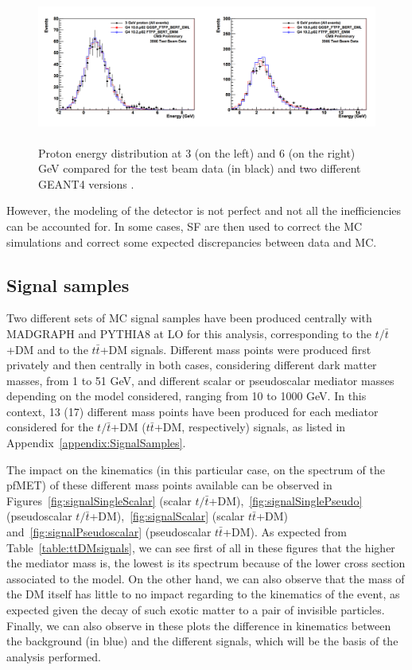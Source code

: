 \documentclass[a4paper, 10pt, openright]{report}
\begin{document}
\begin{figure}[htbp]
\begin{center}
\includegraphics[width=14cm, height=5cm]{figs/CMSGEANT.png}
\caption{Proton energy distribution at 3 (on the left) and 6 (on the right) GeV compared for the test beam data (in black) and two different GEANT4 versions \cite{GEANTComp}.}
\label{fig:CMSGEANT}
\end{center}
\end{figure}

However, the modeling of the detector is not perfect and not all the inefficiencies can be accounted for. In some cases, \ac{SF} are then used to correct the \ac{MC} simulations and correct some expected discrepancies between data and \ac{MC}.

\subsection{Signal samples} \label{section:Signals}

Two different sets of \ac{MC} signal samples have been produced centrally with MADGRAPH and PYTHIA8 at \ac{LO} for this analysis, corresponding to the $t/\bar t$+DM and to the $t \bar t$+DM signals. Different mass points were produced first privately and then centrally in both cases, considering different dark matter masses, from 1 to 51 GeV, and different scalar or pseudoscalar mediator masses depending on the model considered, ranging from 10 to 1000 GeV. In this context, 13 (17) different mass points have been produced for each mediator considered for the $t/\bar t$+DM ($t \bar t$+DM, respectively) signals, as listed in Appendix~\ref{appendix:SignalSamples}.

The impact on the kinematics (in this particular case, on the spectrum of the pf\ac{MET}) of these different mass points available can be observed in Figures~\ref{fig:signalSingleScalar} (scalar $t/\bar t$+DM),~\ref{fig:signalSinglePseudo} (pseudoscalar $t/\bar t$+DM),~\ref{fig:signalScalar} (scalar $t \bar t$+DM) and~\ref{fig:signalPseudoscalar} (pseudoscalar $t \bar t$+DM). As expected from Table~\ref{table:ttDMsignals}, we can see first of all in these figures that the higher the mediator mass is, the lowest is its spectrum because of the lower cross section associated to the model. On the other hand, we can also observe that the mass of the \ac{DM} itself has little to no impact regarding to the kinematics of the event, as expected given the decay of such exotic matter to a pair of invisible particles. Finally, we can also observe in these plots the difference in kinematics between the background (in blue) and the different signals, which will be the basis of the analysis performed.
\end{document}
